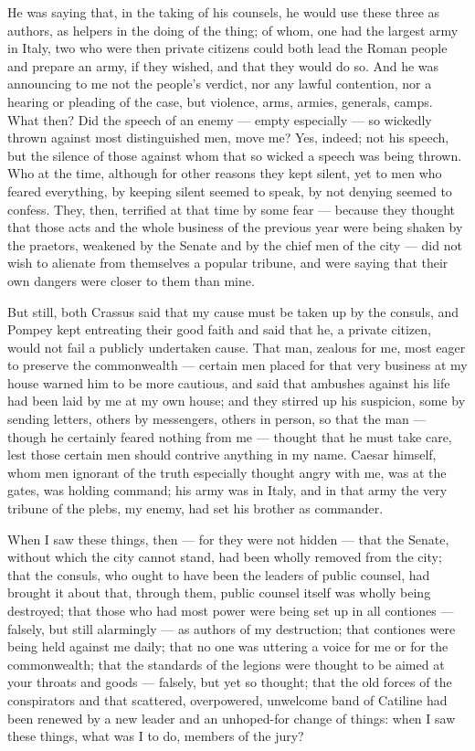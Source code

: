  He was saying that, in the taking of his counsels, he would use these three as authors, as helpers in the doing of the thing; of whom, one had the largest army in Italy, two who were then private citizens could both lead the Roman people and prepare an army, if they wished, and that they would do so. And he was announcing to me not the people's verdict, nor any lawful contention, nor a hearing or pleading of the case, but violence, arms, armies, generals, camps. What then? Did the speech of an enemy --- empty especially --- so wickedly thrown against most distinguished men, move me? Yes, indeed; not his speech, but the silence of those against whom that so wicked a speech was being thrown. Who at the time, although for other reasons they kept silent, yet to men who feared everything, by keeping silent seemed to speak, by not denying seemed to confess. They, then, terrified at that time by some fear --- because they thought that those acts and the whole business of the previous year were being shaken by the praetors, weakened by the Senate and by the chief men of the city --- did not wish to alienate from themselves a popular tribune, and were saying that their own dangers were closer to them than mine.

 But still, both Crassus said that my cause must be taken up by the consuls, and Pompey kept entreating their good faith and said that he, a private citizen, would not fail a publicly undertaken cause. That man, zealous for me, most eager to preserve the commonwealth --- certain men placed for that very business at my house warned him to be more cautious, and said that ambushes against his life had been laid by me at my own house; and they stirred up his suspicion, some by sending letters, others by messengers, others in person, so that the man --- though he certainly feared nothing from me --- thought that he must take care, lest those certain men should contrive anything in my name. Caesar himself, whom men ignorant of the truth especially thought angry with me, was at the gates, was holding command; his army was in Italy, and in that army the very tribune of the plebs, my enemy, had set his brother as commander.

 When I saw these things, then --- for they were not hidden --- that the Senate, without which the city cannot stand, had been wholly removed from the city; that the consuls, who ought to have been the leaders of public counsel, had brought it about that, through them, public counsel itself was wholly being destroyed; that those who had most power were being set up in all contiones --- falsely, but still alarmingly --- as authors of my destruction; that contiones were being held against me daily; that no one was uttering a voice for me or for the commonwealth; that the standards of the legions were thought to be aimed at your throats and goods --- falsely, but yet so thought; that the old forces of the conspirators and that scattered, overpowered, unwelcome band of Catiline had been renewed by a new leader and an unhoped-for change of things: when I saw these things, what was I to do, members of the jury?

